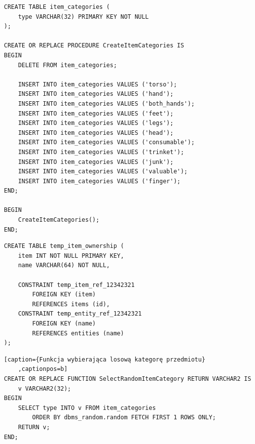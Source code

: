 \documentclass[11pt]{article}
\numberwithin{figure}{subsection}
\begin{document}
	
	\begin{lstlisting}[caption={Wygenerowanie kategori przedmiotów do
	tablicy},captionpos=b]
CREATE TABLE item_categories (
	type VARCHAR(32) PRIMARY KEY NOT NULL
);

CREATE OR REPLACE PROCEDURE CreateItemCategories IS
BEGIN
	DELETE FROM item_categories;
	
	INSERT INTO item_categories VALUES ('torso');
	INSERT INTO item_categories VALUES ('hand');
	INSERT INTO item_categories VALUES ('both_hands');
	INSERT INTO item_categories VALUES ('feet');
	INSERT INTO item_categories VALUES ('legs');
	INSERT INTO item_categories VALUES ('head');
	INSERT INTO item_categories VALUES ('consumable');
	INSERT INTO item_categories VALUES ('trinket');
	INSERT INTO item_categories VALUES ('junk');
	INSERT INTO item_categories VALUES ('valuable');
	INSERT INTO item_categories VALUES ('finger');
END;

BEGIN
	CreateItemCategories();
END;
    \end{lstlisting}

	
	\begin{lstlisting}[caption={Utworzenie tabeli pomocniczej do wygenerowania
	tranzakcji},captionpos=b]
CREATE TABLE temp_item_ownership (
	item INT NOT NULL PRIMARY KEY,
	name VARCHAR(64) NOT NULL,
	
	CONSTRAINT temp_item_ref_12342321
		FOREIGN KEY (item)
		REFERENCES items (id),
	CONSTRAINT temp_entity_ref_12342321
		FOREIGN KEY (name)
		REFERENCES entities (name)
);
    \end{lstlisting}
	
	
	\begin{lstlisting}[caption={Funkcja wybierająca losową kategorę przedmiotu}
	,captionpos=b]
CREATE OR REPLACE FUNCTION SelectRandomItemCategory RETURN VARCHAR2 IS
	v VARCHAR2(32);
BEGIN
	SELECT type INTO v FROM item_categories
		ORDER BY dbms_random.random FETCH FIRST 1 ROWS ONLY;
	RETURN v;
END;
    \end{lstlisting}
	
\end{document}
